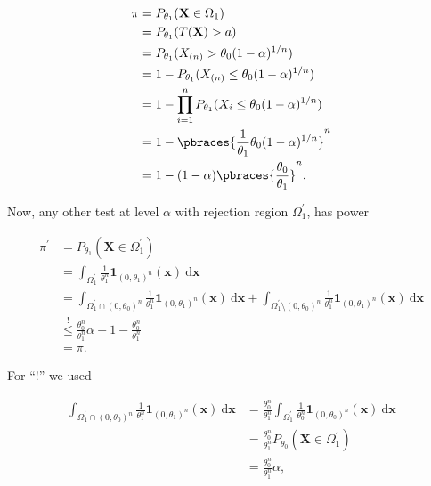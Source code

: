\begin{solution}
\begin{enumerate}[label = (\alph*)]
    \begin{align*}
        \pi
        & =
        P_{\theta_1}(\mathbf X \in \Omega_1) \\
        & =
        P_{\theta_1}(T(\mathbf X) > a) \\
        & =
        P_{\theta_1}(X_{(n)} > \theta_0 (1 - \alpha)^{1/n}) \\
        & =
        1 - P_{\theta_1}(X_{(n)} \leq \theta_0 (1 - \alpha)^{1/n}) \\
        & =
        1 - \prod_{i =1}^n P_{\theta_1}(X_i \leq \theta_0 (1 - \alpha)^{1/n}) \\
        & =
        1 - \pbraces{\frac{1}{\theta_1} \theta_0 (1 - \alpha)^{1/n}}^n \\
        & =
        1 - (1 - \alpha) \pbraces{\frac{\theta_0}{\theta_1}}^n.
    \end{align*}

    Now, any other test at level $\alpha$ with rejection region $\Omega_1^\prime$, has power

    \begin{align*}
        \pi^\prime
        & =
        P_{\theta_1}(\mathbf X \in \Omega_1^\prime) \\
        & =
        \int_{\Omega_1^\prime}
            \frac{1}{\theta_1^n}
            \mathbf 1_{(0, \theta_1)^n}(\mathbf x)
            ~ \mathrm d \mathbf x \\
        & =
        \int_{\Omega_1^\prime \cap (0, \theta_0)^n}
            \frac{1}{\theta_1^n}
            \mathbf 1_{(0, \theta_1)^n}(\mathbf x)
            ~ \mathrm d \mathbf x
        +
        \int_{\Omega_1^\prime \setminus (0, \theta_0)^n}
            \frac{1}{\theta_1^n}
            \mathbf 1_{(0, \theta_1)^n}(\mathbf x)
            ~ \mathrm d \mathbf x \\
        & \stackrel{!}{\leq}
        \frac{\theta_0^n}{\theta_1^n} \alpha
        +
        1 - \frac{\theta_0^n}{\theta_1^n} \\
        & =
        \pi.
    \end{align*}

    For \enquote{!} we used

    \begin{align*}
        \int_{\Omega_1^\prime \cap (0, \theta_0)^n}
            \frac{1}{\theta_1^n}
            \mathbf 1_{(0, \theta_1)^n}(\mathbf x)
            ~ \mathrm d \mathbf x
        & =
        \frac{\theta_0^n}{\theta_1^n}
        \int_{\Omega_1^\prime}
            \frac{1}{\theta_0^n}
            \mathbf 1_{(0, \theta_0)^n}(\mathbf x)
            ~ \mathrm d \mathbf x \\
        & =
        \frac{\theta_0^n}{\theta_1^n}
        P_{\theta_0}(\mathbf X \in \Omega_1^\prime) \\
        & =
        \frac{\theta_0^n}{\theta_1^n} \alpha,
    \end{align*}


\end{enumerate}
\end{solution}
